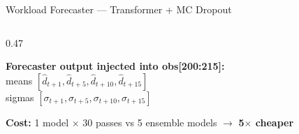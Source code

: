 \documentclass[aspectratio=169,10pt]{beamer}
\begin{document}
\begin{frame}{Workload Forecaster --- Transformer + MC Dropout}
\begin{columns}[T]
\begin{column}{0.47\textwidth}
\vspace{0.2cm}
\begin{tcolorbox}[accentbox]
\small \textbf{Forecaster output injected into obs[200:215]:}\\
means $[\hat{d}_{t+1}, \hat{d}_{t+5}, \hat{d}_{t+10}, \hat{d}_{t+15}]$\\
sigmas $[\sigma_{t+1}, \sigma_{t+5}, \sigma_{t+10}, \sigma_{t+15}]$
\end{tcolorbox}

\vspace{0.2cm}
\begin{tcolorbox}[warnbox]
\small \textbf{Cost:} 1 model $\times$ 30 passes vs 5 ensemble models $\to$ \textbf{5$\times$ cheaper}
\end{tcolorbox}
\end{column}
\end{columns}
\end{frame}
\end{document}
